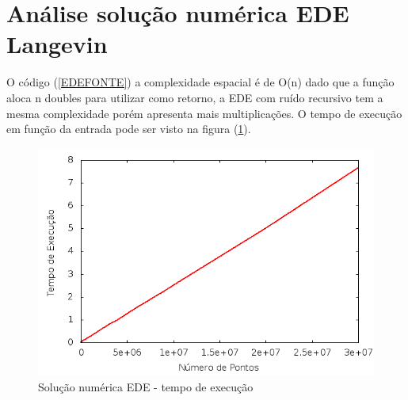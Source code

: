 \section{Análise solução numérica EDE Langevin}
O código (\ref{EDEFONTE}) a complexidade espacial é de O(n) dado que a função aloca n doubles para utilizar como retorno, a EDE com ruído recursivo tem a mesma complexidade porém apresenta mais multiplicações. O tempo de execução em função da entrada pode ser visto na figura (\ref{tmpExecNumericaEDE}).
\begin{figure}[!htb]
\centering
\begin{minipage}[b]{0.45\linewidth}
\includegraphics[width=\linewidth]{./img/AspectosNumericos/EulerMaruyamaComplexidade.png}
\caption{Solução numérica EDE - tempo de execução}
\label{tmpExecNumericaEDE}
\end{minipage} \hfill
\end{figure}


